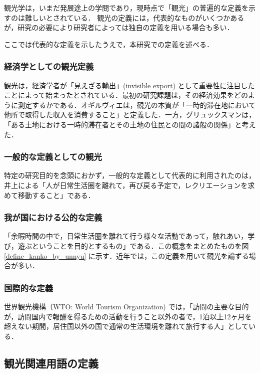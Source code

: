 \documentclass{jsarticle}
\begin{document}
観光学は，いまだ発展途上の学問であり，現時点で「観光」の普遍的な定義を示すのは難しいとされている\cite{kanko_define}．
観光の定義には，代表的なものがいくつかあるが，研究の必要により研究者によっては独自の定義を用いる場合も多い．

ここでは代表的な定義を示したうえで，本研究での定義を述べる．


\subsubsection{経済学としての観光定義}

観光は，経済学者が「見えざる輸出」(invisible export) として重要性に注目したことによって始まったとされている．最初の研究課題は，その経済効果をどのように測定するかである．オギルヴィエは，観光の本質が「一時的滞在地において他所で取得した収入を消費すること」と定義した．一方，グリュックスマンは，「ある土地における一時的滞在者とその土地の住民との間の諸般の関係」と考えた．

\subsubsection{一般的な定義としての観光}

特定の研究目的を念頭におかず，一般的な定義として代表的に利用されたのは，井上による「人が日常生活圏を離れて，再び戻る予定で，レクリエーションを求めて移動すること」である．

\subsubsection{我が国における公的な定義}

「余暇時間の中で，日常生活圏を離れて行う様々な活動であって，触れあい，学び，遊ぶということを目的とするもの」である\cite{toshin_1995}．この概念をまとめたものを図\ref{define_kanko_by_unnyu} に示す．近年では，この定義を用いて観光を論ずる場合が多い．

\subsubsection{国際的な定義}

世界観光機構（WTO: World Tourism Organization) では，「訪問の主要な目的が，訪問国内で報酬を得るための活動を行うこと以外の者で，1泊以上12ヶ月を超えない期間，居住国以外の国で通常の生活環境を離れて旅行する人」としている．

\subsection{観光関連用語の定義}
\end{document}
